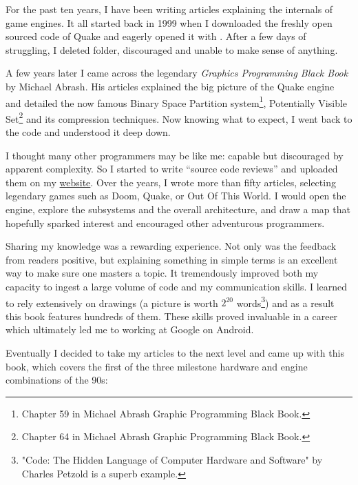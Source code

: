 \documentclass[book.tex]{subfiles}
\begin{document}
For the past ten years, I have been writing articles explaining the internals of game engines. It all started back in 1999 when I downloaded the freshly open sourced code of \mbox{Quake} and eagerly opened it with . After a few days of struggling, I deleted  folder, discouraged and unable to make sense of anything.

\bigskip

A few years later I came across the legendary \textit{Graphics Programming Black Book} by Michael Abrash. His articles explained the big picture of the Quake engine and detailed the now famous Binary Space Partition system\footnote{Chapter 59 in Michael Abrash Graphic Programming Black Book.}, Potentially Visible Set\footnote{Chapter 64 in Michael Abrash Graphic Programming Black Book.} and its compression techniques. Now knowing what to expect, I went back to the code and understood it deep down.

\bigskip

I thought many other programmers may be like me: capable but discouraged by apparent complexity. So I started to write ``source  code reviews'' and uploaded them on my
\href{http://fabiensanglard.net}{website}. Over the years, I wrote more than fifty articles, selecting legendary games such as Doom, Quake, or Out Of This World. I would open the engine, explore the subsystems and the overall architecture, and draw a map that hopefully sparked interest and encouraged other adventurous programmers.

\bigskip

Sharing my knowledge was a rewarding experience. Not only was the feedback from readers positive, but explaining something in simple terms is an excellent way to make sure one masters a topic. It tremendously improved both my capacity to ingest a large volume of code and my communication skills. I learned to rely extensively on drawings (a picture is worth $2^{20}$ words\footnote{"Code: The Hidden Language of Computer Hardware and Software" by Charles Petzold is a superb example.}) and as a result this book features hundreds of them. These skills proved invaluable in a career which ultimately led me to working at Google on Android.

\newpage

Eventually I decided to take my articles to the next level and came up with this book, which covers the first of the three milestone hardware and engine combinations of the 90s:
\end{document}

